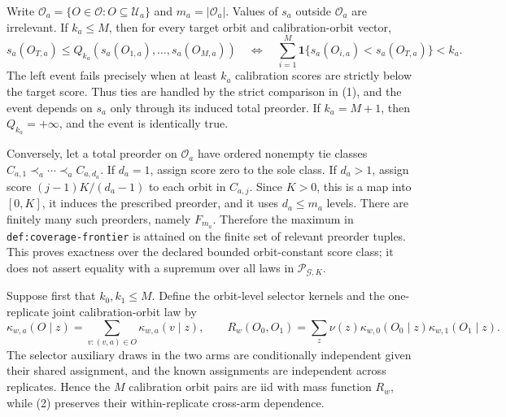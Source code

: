 Write \(\mathcal O_a=\{O\in\mathcal O:O\subseteq\mathcal U_a\}\) and \(m_a=|\mathcal O_a|\). Values of \(s_a\) outside \(\mathcal O_a\) are irrelevant. If \(k_a\le M\), then for every target orbit and calibration-orbit vector,
\[
s_a(O_{T,a})\le Q_{k_a}(s_a(O_{1,a}),\ldots,s_a(O_{M,a}))
\quad\Longleftrightarrow\quad
\sum_{i=1}^M\mathbf 1\{s_a(O_{i,a})<s_a(O_{T,a})\}<k_a.
\tag{1}
\]
The left event fails precisely when at least \(k_a\) calibration scores are strictly below the target score. Thus ties are handled by the strict comparison in (1), and the event depends on \(s_a\) only through its induced total preorder. If \(k_a=M+1\), then \(Q_{k_a}=+\infty\), and the event is identically true.

Conversely, let a total preorder on \(\mathcal O_a\) have ordered nonempty tie classes \(C_{a,1}\prec_a\cdots\prec_a C_{a,d_a}\). If \(d_a=1\), assign score zero to the sole class. If \(d_a>1\), assign score \((j-1)K/(d_a-1)\) to each orbit in \(C_{a,j}\). Since \(K>0\), this is a map into \([0,K]\), it induces the prescribed preorder, and it uses \(d_a\le m_a\) levels. There are finitely many such preorders, namely \(F_{m_a}\). Therefore the maximum in \texttt{def:coverage-frontier} is attained on the finite set of relevant preorder tuples. This proves exactness over the declared bounded orbit-constant score class; it does not assert equality with a supremum over all laws in \(\mathcal P_{\mathcal G,K}\).

Suppose first that \(k_0,k_1\le M\). Define the orbit-level selector kernels and the one-replicate joint calibration-orbit law by
\[
\kappa_{w,a}(O\mid z)=\sum_{v:(v,a)\in O}\kappa_{w,a}(v\mid z),\qquad
R_w(O_0,O_1)=\sum_z\nu(z)\kappa_{w,0}(O_0\mid z)\kappa_{w,1}(O_1\mid z).
\tag{2}
\]
The selector auxiliary draws in the two arms are conditionally independent given their shared assignment, and the known assignments are independent across replicates. Hence the \(M\) calibration orbit pairs are iid with mass function \(R_w\), while (2) preserves their within-replicate cross-arm dependence.


